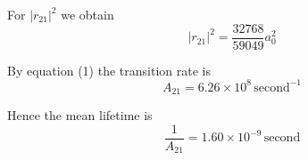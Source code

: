 \documentclass[12pt]{article}
\begin{document}
For $|r_{21}|^2$ we obtain
\begin{equation*}
|r_{21}|^2=\frac{32768}{59049}a_0^2
\end{equation*}

By equation (1) the transition rate is
\begin{equation*}
A_{21}=6.26\times10^8\,\text{second}^{-1}
\end{equation*}

Hence the mean lifetime is
\begin{equation*}
\frac{1}{A_{21}}=1.60\times10^{-9}\,\text{second}
\end{equation*}
\end{document}
